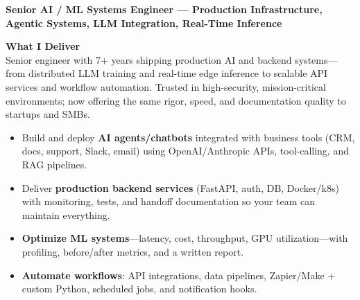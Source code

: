 \documentclass[10.5pt]{res}
\begin{document}
\begin{resume}
\begin{center}
{\large \textbf{Senior AI / ML Systems Engineer --- Production Infrastructure, Agentic Systems, LLM Integration, Real-Time Inference}}
\end{center}
\vspace{-0.15cm}

{\bf What I Deliver} \vspace{.27 cm}\\
Senior engineer with 7+ years shipping production AI and backend systems---from distributed LLM training and real-time edge inference to scalable API services and workflow automation. Trusted in high-security, mission-critical environments; now offering the same rigor, speed, and documentation quality to startups and SMBs.
\vspace{.27 cm}
\begin{itemize}
    \item Build and deploy \textbf{AI agents/chatbots} integrated with business tools (CRM, docs, support, Slack, email) using OpenAI/Anthropic APIs, tool-calling, and RAG pipelines.
    \item Deliver \textbf{production backend services} (FastAPI, auth, DB, Docker/k8s) with monitoring, tests, and handoff documentation so your team can maintain everything.
    \item \textbf{Optimize ML systems}---latency, cost, throughput, GPU utilization---with profiling, before/after metrics, and a written report.
    \item \textbf{Automate workflows}: API integrations, data pipelines, Zapier/Make + custom Python, scheduled jobs, and notification hooks.
\end{itemize}


\end{resume}
\end{document}
